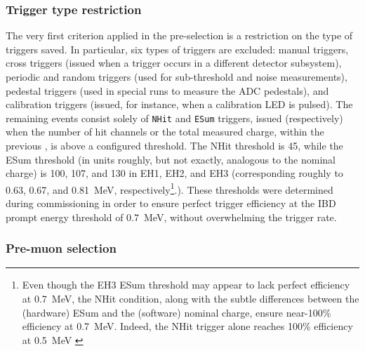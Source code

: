 \documentclass[../thesis.tex]{subfiles}
\begin{document}
\subsubsection{Trigger type restriction}
\label{sec:selTrigType}

The very first criterion applied in the pre-selection is a restriction on the type of triggers saved. In particular, six types of triggers are excluded: manual triggers, cross triggers (issued when a trigger occurs in a different detector subsystem), periodic and random triggers (used for sub-threshold and noise measurements), pedestal triggers (used in special runs to measure the ADC pedestals), and calibration triggers (issued, for instance, when a calibration LED is pulsed). The remaining events consist solely of \texttt{NHit} and \texttt{ESum} triggers, issued (respectively) when the number of hit channels or the total measured charge, within the previous \us, is above a configured threshold. The NHit threshold is 45, while the ESum threshold (in units roughly, but not exactly, analogous to the nominal charge) is 100, 107, and 130 in EH1, EH2, and EH3 (corresponding roughly to 0.63, 0.67, and 0.81~MeV, respectively\footnote{Even though the EH3 ESum threshold may appear to lack perfect efficiency at 0.7~MeV, the NHit condition, along with the subtle differences between the (hardware) ESum and the (software) nominal charge, ensure near-100\% efficiency at 0.7~MeV. Indeed, the NHit trigger alone reaches 100\% efficiency at 0.5~MeV \cite{weili_trig_eff}}.). These thresholds were determined during commissioning in order to ensure perfect trigger efficiency at the IBD prompt energy threshold of 0.7~MeV, without overwhelming the trigger rate.

\subsubsection{Pre-muon selection}
\label{sec:selPreMuons}
\end{document}
